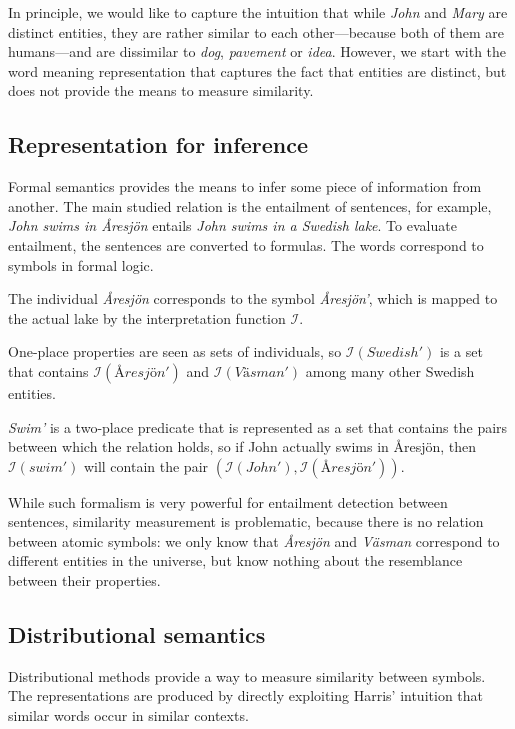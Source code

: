 In principle, we would like to capture the intuition that while \textit{John} and \textit{Mary} are distinct entities, they are rather similar to each other---because both of them are humans---and are dissimilar to \textit{dog}, \textit{pavement} or \textit{idea}. However, we start with the word meaning representation that captures the fact that entities are distinct, but does not provide the means to measure similarity.

\subsection{Representation for inference}
\label{sec:classical-approaches}

Formal semantics provides the means to infer some piece of information from another. The main studied relation is the entailment of sentences, for example, \textit{John swims in Åresjön} entails \textit{John swims in a Swedish lake}. To evaluate entailment, the sentences are converted to formulas. The words correspond to symbols in formal logic.

The individual \textit{Åresjön} corresponds to the symbol \textit{Åresjön'}, which is mapped to the actual lake by the interpretation function $\mathcal{I}$.

One-place properties are seen as sets of individuals, so $\mathcal{I}(\mathit{Swedish'})$ is a set that contains $\mathcal{I}(\mathit{Åresjön'})$ and $\mathcal{I}(\mathit{Väsman'})$ among many other Swedish entities.

\textit{Swim'} is a two-place predicate that is represented as a set that contains the pairs between which the relation holds, so if John actually swims in Åresjön, then $\mathcal{I}(\mathit{swim'})$ will contain the pair $(\mathcal{I}(\mathit{John'}), \mathcal{I}(\mathit{Åresjön'}))$.

While such formalism is very powerful for entailment detection between sentences, similarity measurement is problematic, because there is no relation between atomic symbols: we only know that \textit{Åresjön} and \textit{Väsman} correspond to different entities in the universe, but know nothing about the resemblance between their properties.

\subsection{Distributional semantics}
\label{sec:distr-repr}

Distributional methods provide a way to measure similarity between symbols. The representations are produced by directly exploiting Harris' \citeyearpar{harris1954distributional} intuition that similar words occur in similar contexts.

